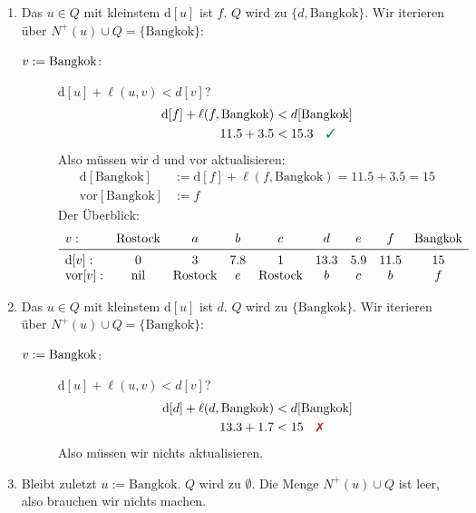 \documentclass[
a4paper, %
11pt,
]
{scrartcl}
\newcommand{\dist}{\text{d}}
\newcommand{\vor}{\text{vor}}
\newcommand{\nil}{\text{nil}}
\begin{document}
\begin{enumerate}
  \item Das $u \in Q$ mit kleinstem $\dist[u]$ ist $f$.
    $Q$ wird zu $\{ d, \text{Bangkok}\}$.
    Wir iterieren über $N^+(u) \cup Q = \{ \text{Bangkok} \}$:

    \begin{description}
      \item[$v := \textnormal{Bangkok}$:] $\dist[u] + \ell(u, v) < d[v]$?
        \begin{align*}
          \dist[f] + \ell(f, \text{Bangkok}) & < d[\text{Bangkok}]\\
          \num{11,5} + \num{3,5} & < \num{15,3} \quad \richtig
        \end{align*}
        Also müssen wir $\dist$ und $\vor$ aktualisieren:
        \begin{align*}
          \dist[\text{Bangkok}] & := \dist[f] + \ell(f, \text{Bangkok})
            = \num{11,5} + \num{3,5}= \num{15}\\
          \vor[\text{Bangkok}] & := f
        \end{align*}
        Der Überblick:
        \begin{align*}
          \begin{array}{lcccccccc}
            v: & \text{Rostock} & a & b & c & d & e & f & \text{Bangkok}\\
            \midrule
            \dist[v]:
              & 0 & 3 & \num{7,8} & 1 & \num{13,3} & \num{5,9} & \num{11,5} & \num{15}\\
            \vor[v]:
              & \nil & \text{Rostock} & e & \text{Rostock} & b & c & b & f
          \end{array}
        \end{align*}
    \end{description}

  \item Das $u \in Q$ mit kleinstem $\dist[u]$ ist $d$.
    $Q$ wird zu $\{ \text{Bangkok}\}$.
    Wir iterieren über $N^+(u) \cup Q = \{ \text{Bangkok} \}$:

    \begin{description}
      \item[$v := \textnormal{Bangkok}$:] $\dist[u] + \ell(u, v) < d[v]$?
        \begin{align*}
          \dist[d] + \ell(d, \text{Bangkok}) & < d[\text{Bangkok}]\\
          \num{13,3} + \num{1,7} & < \num{15} \quad \falsch
        \end{align*}
        Also müssen wir nichts aktualisieren.
    \end{description}

  \item Bleibt zuletzt $u := \text{Bangkok}$.
    $Q$ wird zu $\emptyset$.
    Die Menge $N^+(u) \cup Q$ ist leer, also brauchen wir nichts machen.
\end{enumerate}
\end{document}
